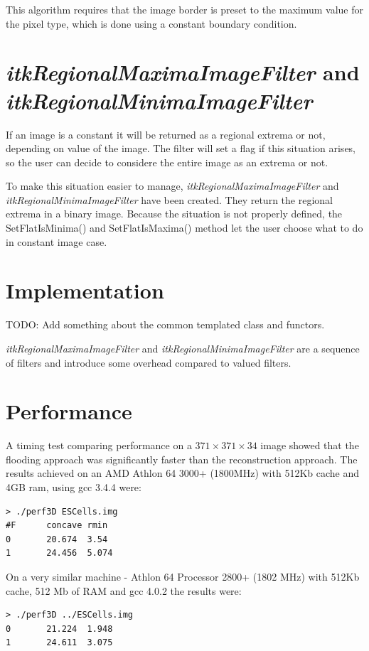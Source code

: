 \documentclass{llncs}
\begin{document}
This algorithm requires that the image border is preset to the maximum
value for the pixel type, which is done using a constant boundary
condition.

\section{{\em itkRegionalMaximaImageFilter} and {\em itkRegionalMinimaImageFilter}}
If an image is a constant it will be returned as a regional extrema or not,
depending on value of the image. The filter will set a flag if
this situation arises, so the user can decide to considere the entire image as an
extrema or not.

To make this situation easier to manage, {\em itkRegionalMaximaImageFilter} and
{\em itkRegionalMinimaImageFilter} have been created. They return the regional
extrema in a binary image. Because the situation is not properly defined, the 
SetFlatIsMinima() and SetFlatIsMaxima() method let the user choose what to do
in constant image case.

\section{Implementation}

TODO: Add something about the common templated class and functors.

{\em itkRegionalMaximaImageFilter} and {\em itkRegionalMinimaImageFilter} are a sequence
of filters and introduce some overhead compared to valued filters.

\section{Performance}
A timing test comparing performance on a $371 \times 371 \times 34$
image showed that the flooding approach was significantly faster than
the reconstruction approach. The results achieved on an AMD Athlon 64
3000+ (1800MHz) with 512Kb cache and 4GB ram, using gcc 3.4.4 were:
\begin{verbatim}
> ./perf3D ESCells.img
#F      concave rmin
0       20.674  3.54
1       24.456  5.074
\end{verbatim}
On a very similar machine - Athlon 64 Processor 2800+ (1802
MHz) with 512Kb cache, 512 Mb of RAM and gcc 4.0.2 the results were:
\begin{verbatim}
> ./perf3D ../ESCells.img
0       21.224  1.948
1       24.611  3.075
\end{verbatim}
\end{document}
